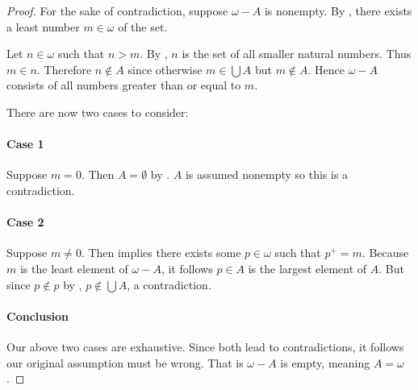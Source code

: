 \documentclass{report}
\begin{document}
  \begin{proof}

    For the sake of contradiction, suppose $\omega - A$ is nonempty.
    By , there exists a least number
      $m \in \omega$ of the set.

    Let $n \in \omega$ such that $n > m$.
    By , $n$ is the set of all smaller
      natural numbers.
    Thus $m \in n$.
    Therefore $n \not\in A$ since otherwise $m \in \bigcup A$ but $m \not\in A$.
    Hence $\omega - A$ consists of all numbers greater than or equal to $m$.

    There are now two cases to consider:

    \paragraph{Case 1}%

      Suppose $m = 0$.
      Then $A = \emptyset$ by .
      $A$ is assumed nonempty so this is a contradiction.

    \paragraph{Case 2}%

      Suppose $m \neq 0$.
      Then  implies there exists some $p \in \omega$
        such that $p^+ = m$.
      Because $m$ is the least element of $\omega - A$, it follows $p \in A$ is
        the largest element of $A$.
      But since $p \not\in p$ by ,
        $p \not\in \bigcup A$, a contradiction.

    \paragraph{Conclusion}%

      Our above two cases are exhaustive.
      Since both lead to contradictions, it follows our original assumption
        must be wrong.
      That is $\omega - A$ is empty, meaning $A = \omega$.

  \end{proof}

\subsection{}%
\end{document}
